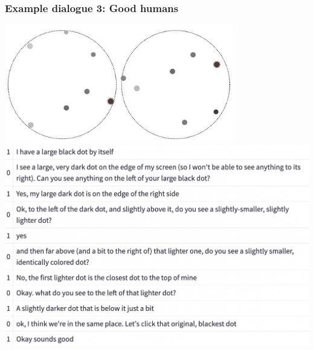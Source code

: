 \documentclass{beamer}
\begin{document}
\begin{frame}
\frametitle{Example dialogue 3: Good humans}
\centering
\includegraphics[width=0.75\textwidth]{img/dots3.png}
\includegraphics[width=\textwidth,clip,trim={0 0 0 9cm}]{img/words3.png}
\end{frame}
\end{document}
